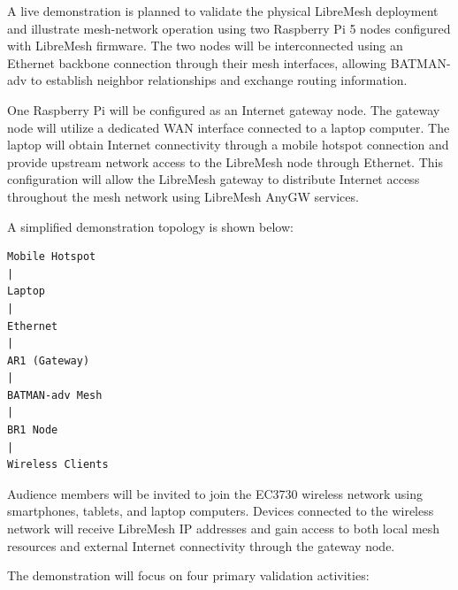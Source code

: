 \documentclass[conference]{IEEEtran}
\begin{document}
A live demonstration is planned to validate the physical LibreMesh deployment and illustrate mesh-network operation using two Raspberry Pi 5 nodes configured with LibreMesh firmware. The two nodes will be interconnected using an Ethernet backbone connection through their mesh interfaces, allowing BATMAN-adv to establish neighbor relationships and exchange routing information.

One Raspberry Pi will be configured as an Internet gateway node. The gateway node will utilize a dedicated WAN interface connected to a laptop computer. The laptop will obtain Internet connectivity through a mobile hotspot connection and provide upstream network access to the LibreMesh node through Ethernet. This configuration will allow the LibreMesh gateway to distribute Internet access throughout the mesh network using LibreMesh AnyGW services.

A simplified demonstration topology is shown below:

\begin{verbatim}
Mobile Hotspot
|
Laptop
|
Ethernet
|
AR1 (Gateway)
|
BATMAN-adv Mesh
|
BR1 Node
|
Wireless Clients
\end{verbatim}

Audience members will be invited to join the EC3730 wireless network using smartphones, tablets, and laptop computers. Devices connected to the wireless network will receive LibreMesh IP addresses and gain access to both local mesh resources and external Internet connectivity through the gateway node.

The demonstration will focus on four primary validation activities:
\end{document}
